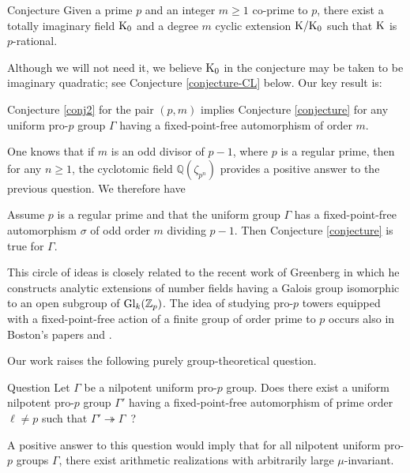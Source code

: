 \documentclass[12pt,a4paper,twoside,english]{smfart}
\def\K{{\rm K}}
\def\Q{{\mathbb Q}}
\def\Z{{\mathbb Z}}
\def\Gl{{\rm Gl}}
\newenvironment{Question}{\begin{enonce}{Question}}{\end{enonce}}
\newenvironment{conjecture}{\begin{enonce}{Conjecture}}{\end{enonce}}
\begin{document}
\begin{conjecture}\label{conj2}
Given a prime $p$ and an integer $m \geq 1 $ co-prime to $p$, there exist a totally imaginary field $\K_0$ and a
 degree $m$  cyclic extension  $\K/\K_0$ such that $\K$ is $p$-rational.  
\end{conjecture}

Although we will not need it, we believe $\K_0$ in the conjecture may be taken to be imaginary quadratic; see Conjecture \ref{conjecture-CL} below. Our key result is:

\begin{theo}
Conjecture \ref{conj2} for the pair $(p,m)$ implies Conjecture \ref{conjecture} for any uniform pro-$p$ group $\Gamma$ having a fixed-point-free automorphism of order $m$.
\end{theo}


One knows that if $m$ is an odd divisor of $p-1$, where $p$ is a regular prime, then for any $n\geq 1$, the cyclotomic field $\Q(\zeta_{p^n})$ provides a positive answer to the previous question.  We therefore have

\begin{coro}\label{maintheorem} Assume $p$ is a regular prime and that the uniform group $\Gamma$ has a fixed-point-free automorphism $\sigma$  of odd order $m$ dividing $p-1$. Then Conjecture \ref{conjecture} is true for $\Gamma$.
\end{coro}

\medskip

 This circle of ideas is closely related  to  the recent work of Greenberg \cite{Greenberg} in which he constructs analytic extensions of number fields having a Galois group isomorphic to  an open subgroup of $\Gl_k(\Z_p)$. The idea of studying pro-$p$ towers equipped with a fixed-point-free action of a finite group of order prime to $p$ occurs also in Boston's papers \cite{Boston2} and \cite{Boston3}.

\medskip

Our work raises the following purely group-theoretical question.
 \begin{Question}\label{GTquestion}
  Let $\Gamma$ be a nilpotent uniform pro-$p$ group. Does there exist a uniform nilpotent pro-$p$ group $\Gamma'$
  having a fixed-point-free automorphism of prime order $\ell \neq p$ such that $\Gamma' \twoheadrightarrow \Gamma$~?
 \end{Question}
A positive answer to this question would imply that for all nilpotent uniform pro-$p$ groups $\Gamma$, there exist arithmetic realizations with arbitrarily large $\mu$-invariant.
\medskip
\end{document}
